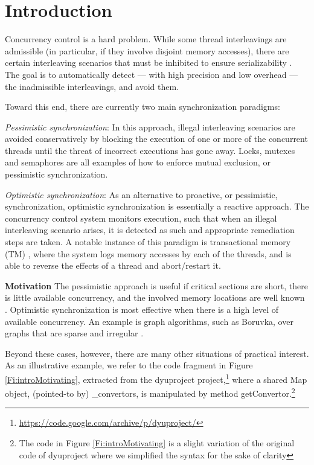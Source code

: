 \section{Introduction}\label{Se:intro}

Concurrency control is a hard problem. While some thread interleavings are admissible (in particular, if they involve disjoint memory accesses), there are certain interleaving scenarios that must be inhibited to ensure serializability \cite{Serializability}. The goal is to automatically detect --- with high precision and low overhead --- the inadmissible interleavings, and avoid them.  

Toward this end, there are currently two main synchronization paradigms:
\begin{compactitem}
	\item \textit{Pessimistic synchronization}: In this approach, illegal interleaving scenarios are avoided conservatively by blocking the execution of one or more of the concurrent threads until the threat of incorrect executions has gone away. Locks, mutexes and semaphores are all examples of how to enforce mutual exclusion, or pessimistic synchronization.
	\item \textit{Optimistic synchronization}: As an alternative to proactive, or pessimistic, synchronization, optimistic synchronization is essentially a reactive approach. The concurrency control system monitors execution, such that when an illegal interleaving scenario arises, it is detected as such and appropriate remediation steps are taken. A notable instance of this paradigm is transactional memory (TM) \cite{DBLP:conf/isca/HerlihyM93}, where the system logs memory accesses by each of the threads, and is able to reverse the effects of a thread and abort/restart it.
\end{compactitem}

\noindent \textbf{Motivation} The pessimistic approach is useful if critical sections are short, there is little available concurrency, and the involved memory locations are well known \cite{AndiKleen}. Optimistic synchronization is most effective when there is a high level of available concurrency. An example is graph algorithms, such as Boruvka, over graphs that are sparse and irregular \cite{KulkarniGalois}.

Beyond these cases, however, there are many other situations of practical interest. As an illustrative example, we refer to the code fragment in Figure \ref{Fi:introMotivating}, extracted from the {\sf dyuproject} project,\footnote{\url{https://code.google.com/archive/p/dyuproject/}} where a shared {\sf Map} object, (pointed-to by) {\sf \_convertors}, is manipulated by method {\sf getConvertor}.\footnote{The code in Figure \ref{Fi:introMotivating} is a slight variation of the original code of {\sf dyuproject} where we simplified the syntax for the sake of clarity}

